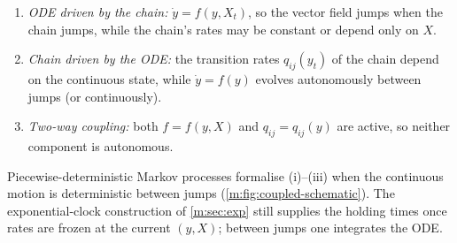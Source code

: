 \begin{enumerate}[label=\textup{(\roman*)}]
\item \emph{ODE driven by the chain:} \(\dot y = f(y,X_t)\), so the vector field
jumps when the chain jumps, while the chain's rates may be constant or depend only
on \(X\).
\item \emph{Chain driven by the ODE:} the transition rates \(q_{ij}(y_t)\) of the
chain depend on the continuous state, while \(\dot y = f(y)\) evolves autonomously
between jumps (or continuously).
\item \emph{Two-way coupling:} both \(f=f(y,X)\) and \(q_{ij}=q_{ij}(y)\) are
active, so neither component is autonomous.
\end{enumerate}

Piecewise-deterministic Markov processes formalise (i)--(iii) when the continuous
motion is deterministic between jumps (\cref{m:fig:coupled-schematic}). The
exponential-clock construction of \cref{m:sec:exp} still supplies the holding times
once rates are frozen at the current \((y,X)\); between jumps one integrates the ODE.


